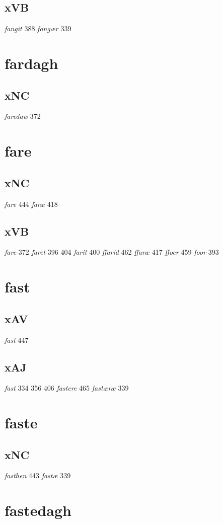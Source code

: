 \documentclass[a4paper,twocolumn]{article}
\begin{document}
\subsection{xVB}
\label{sec:org0dd89b5}
\emph{fangit} 388 \emph{fongær} 339 
\section{fardagh}
\label{sec:org6e58971}
\subsection{xNC}
\label{sec:org736f10d}
\emph{faredaw} 372 
\section{fare}
\label{sec:orgf12c159}
\subsection{xNC}
\label{sec:org53d74f4}
\emph{fare} 444 \emph{faræ} 418 
\subsection{xVB}
\label{sec:org13447f1}
\emph{fare} 372 \emph{faret} 396 404 \emph{farit} 400 \emph{ffarid} 462 \emph{ffaræ} 417 \emph{ffoer} 459 \emph{foor} 393 
\section{fast}
\label{sec:orge401706}
\subsection{xAV}
\label{sec:org44c5698}
\emph{fast} 447 
\subsection{xAJ}
\label{sec:org663a423}
\emph{fast} 334 356 406 \emph{fastere} 465 \emph{fastæræ} 339 
\section{faste}
\label{sec:org399d981}
\subsection{xNC}
\label{sec:org47845ac}
\emph{fasthen} 443 \emph{fastæ} 339 
\section{fastedagh}
\label{sec:orgb1ce3e5}
\end{document}
